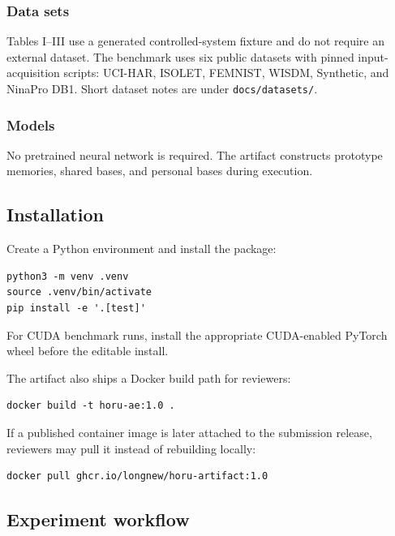 \documentclass[11pt]{article}
\begin{document}
\subsubsection{Data sets}

Tables I--III use a generated controlled-system fixture and do not require an
external dataset. The benchmark uses six public datasets with pinned
input-acquisition scripts: UCI-HAR, ISOLET, FEMNIST, WISDM, Synthetic, and
NinaPro DB1. Short dataset notes are under \texttt{docs/datasets/}.

\subsubsection{Models}

No pretrained neural network is required. The artifact constructs prototype
memories, shared bases, and personal bases during execution.

\subsection{Installation}

Create a Python environment and install the package:

\begin{verbatim}
python3 -m venv .venv
source .venv/bin/activate
pip install -e '.[test]'
\end{verbatim}

For CUDA benchmark runs, install the appropriate CUDA-enabled PyTorch wheel
before the editable install.

The artifact also ships a Docker build path for reviewers:

\begin{verbatim}
docker build -t horu-ae:1.0 .
\end{verbatim}

If a published container image is later attached to the submission release,
reviewers may pull it instead of rebuilding locally:

\begin{verbatim}
docker pull ghcr.io/longnew/horu-artifact:1.0
\end{verbatim}

\subsection{Experiment workflow}
\end{document}

